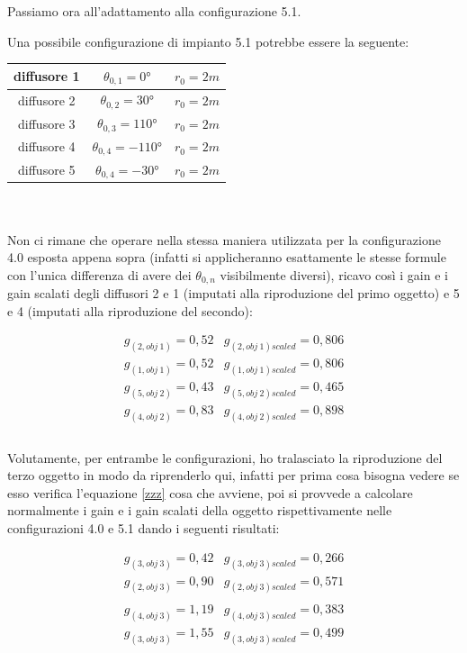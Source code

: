 \documentclass[12pt,a4paper]{report}
\begin{document}
Passiamo ora all'adattamento alla configurazione 5.1.

Una possibile configurazione di impianto 5.1 potrebbe essere la seguente:

\begin{tabular}{|c|c|c|}
\hline
diffusore 1 & $\theta_{0,1}=0°$ & $r_0=2m$\\
\hline
diffusore 2 & $\theta_{0,2}=30°$ & $r_0=2m$\\
\hline
diffusore 3 & $\theta_{0,3}=110°$ & $r_0=2m$\\
\hline
diffusore 4 & $\theta_{0,4}=-110°$ & $r_0=2m$\\
\hline
diffusore 5 & $\theta_{0,4}=-30°$ & $r_0=2m$\\
\hline
\end{tabular} \\
\\

Non ci rimane che operare nella stessa maniera utilizzata per la configurazione 4.0 esposta appena sopra (infatti si applicheranno esattamente le stesse formule con l'unica differenza di avere dei $\theta_{0,n}$ visibilmente diversi), ricavo così i gain e i gain scalati degli diffusori 2 e 1 (imputati alla riproduzione del primo oggetto) e 5 e 4 (imputati alla riproduzione del secondo):

\begin{equation}
\begin{matrix}
g_{(2,obj\ 1)} = 0,52 & g_{(2,obj\ 1)scaled} = 0,806\\
g_{(1,obj\ 1)} = 0,52 & g_{(1,obj\ 1)scaled} = 0,806\\
g_{(5,obj\ 2)} = 0,43 & g_{(5,obj\ 2)scaled} = 0,465\\
g_{(4,obj\ 2)} = 0,83 & g_{(4,obj\ 2)scaled} = 0,898  \\

\end{matrix}
\label{gscalatiesempio2}
\end{equation} \\


Volutamente, per entrambe le configurazioni, ho tralasciato la riproduzione del terzo oggetto in modo da riprenderlo qui, infatti per prima cosa bisogna vedere se esso verifica l'equazione \ref{zzz} cosa che avviene, poi si provvede a calcolare normalmente i gain e i gain scalati della oggetto rispettivamente nelle configurazioni 4.0 e 5.1 dando i seguenti risultati:

\begin{equation}
\begin{matrix}
g_{(3,obj\ 3)} = 0,42 & g_{(3,obj\ 3)scaled} = 0,266\\
g_{(2,obj\ 3)} = 0,90 & g_{(2,obj\ 3)scaled} = 0,571\\
\\
g_{(4,obj\ 3)} = 1,19 & g_{(4,obj\ 3)scaled} = 0,383\\
g_{(3,obj\ 3)} = 1,55 & g_{(3,obj\ 3)scaled} = 0,499\\

\end{matrix}
\label{gscalatiesempiooggetto3}
\end{equation} \\
\end{document}
